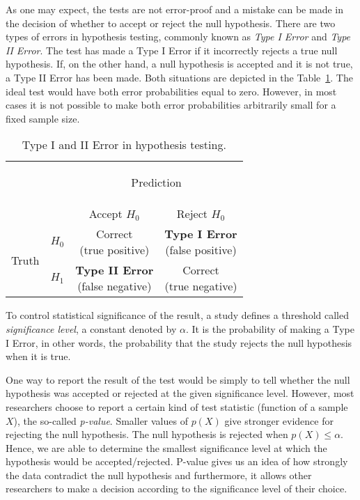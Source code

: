 As one may expect, the tests are not error-proof and a mistake can be made in the decision of whether to accept or reject the null hypothesis. There are two types of errors in hypothesis testing, commonly known as \textit{Type I Error} and \textit{Type II Error}. The test has made a Type I Error if it incorrectly rejects a true null hypothesis. If, on the other hand, a null hypothesis is accepted and it is not true, a Type II Error has been made. Both situations are depicted in the Table~\ref{tab:hypothesis_testing_errors}. The ideal test would have both error probabilities equal to zero. However, in most cases it is not possible to make both error probabilities arbitrarily small for a fixed sample size. \cite{casella}

\begin{table}[!htbp]
\centering
\renewcommand{\arraystretch}{2.5}
\begin{tabular}{l|l|c|c|}
\multicolumn{2}{c}{}&\multicolumn{2}{c}{\begin{Large}Prediction \end{Large}}\\
\cline{3-4}
\multicolumn{2}{c|}{}&Accept $H_{0}$&Reject $H_{0}$\\
\cline{2-4}
\multirow{2}{*}{\begin{Large}Truth\end{Large}}& \textbf{$H_{0}$} & \shortstack{Correct\\(true positive)} & \shortstack{\textbf{Type I Error}\\(false positive)}\\
\cline{2-4}
& \textbf{$H_{1}$} & \shortstack{\textbf{Type II Error}\\(false negative)} & \shortstack{Correct\\(true negative)} \\
\cline{2-4}
\end{tabular}
\caption{Type I and II Error in hypothesis testing.}\label{tab:hypothesis_testing_errors}
\end{table}

To control statistical significance of the result, a study defines a threshold called \textit{significance level}, a constant denoted by $\alpha$. It is the probability  of making a Type I Error, in other words, the probability that the study rejects the null hypothesis when it is true.

One way to report the result of the test would be simply to tell whether the null hypothesis was accepted or rejected at the given significance level. However, most researchers choose to report a certain kind of test statistic (function of a sample $X$), the so-called \textit{p-value}.
Smaller values of $p(X)$ give stronger evidence for rejecting the null hypothesis. The null hypothesis is rejected when $p(X) \leq \alpha$. Hence, we are able to determine the smallest significance level at which the hypothesis would be accepted/rejected. P-value gives us an idea of how strongly the data contradict the null hypothesis and furthermore, it allows other researchers to make a decision according to the significance level of their choice. \cite{sham_purcell, casella, lehmann}

